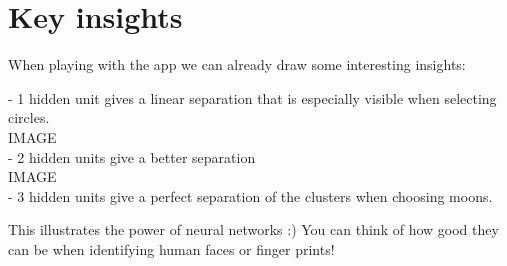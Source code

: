 \section{Key insights}

When playing with the app we can already draw some interesting insights:

- 1 hidden unit gives a linear separation that is especially visible when selecting circles. \\

IMAGE \\

- 2 hidden units give a better separation \\

IMAGE \\

- 3 hidden units give a perfect separation of the clusters when choosing moons.

This illustrates the power of neural networks :) You can think of how good they can be when identifying human faces or finger prints!